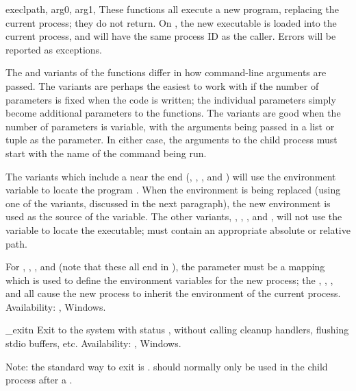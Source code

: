 \begin{funcdesc}{execl}{path, arg0, arg1, \moreargs}
These functions all execute a new program, replacing the current
process; they do not return.  On \UNIX, the new executable is loaded
into the current process, and will have the same process ID as the
caller.  Errors will be reported as  exceptions.

The  and  variants of the
 functions differ in how command-line arguments are
passed.  The  variants are perhaps the easiest to work
with if the number of parameters is fixed when the code is written;
the individual parameters simply become additional parameters to the
 functions.  The  variants are good
when the number of parameters is variable, with the arguments being
passed in a list or tuple as the  parameter.  In either
case, the arguments to the child process must start with the name of
the command being run.

The variants which include a  near the end
(, , ,
and ) will use the  environment
variable to locate the program .  When the environment is
being replaced (using one of the  variants,
discussed in the next paragraph), the
new environment is used as the source of the  variable.
The other variants, , ,
, and , will not use the
 variable to locate the executable;  must
contain an appropriate absolute or relative path.

For , , ,
and  (note that these all end in ),
the  parameter must be a mapping which is used to define the
environment variables for the new process; the ,
, , and 
all cause the new process to inherit the environment of the current
process.
Availability: \UNIX, Windows.
\end{funcdesc}

\begin{funcdesc}{_exit}{n}
Exit to the system with status , without calling cleanup
handlers, flushing stdio buffers, etc.
Availability: \UNIX, Windows.

Note: the standard way to exit is .
 should normally only be used in the child process
after a .
\end{funcdesc}

